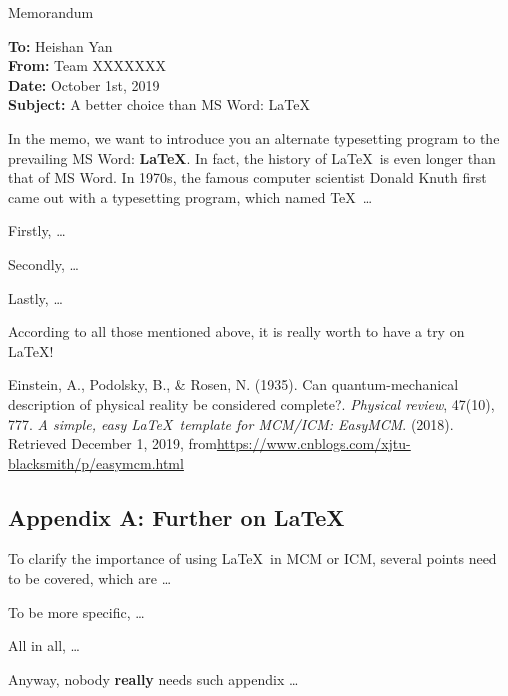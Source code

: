 \documentclass[12pt]{article}  %
\begin{document}
\begin{letter}{Memorandum}
\begin{flushleft}  %
\textbf{To:} Heishan Yan\\
\textbf{From:} Team XXXXXXX\\
\textbf{Date:} October 1st, 2019\\
\textbf{Subject:} A better choice than MS Word: \LaTeX
\end{flushleft}

In the memo, we want to introduce you an alternate typesetting program to the prevailing MS Word: \textbf{\LaTeX}. In fact, the history of \LaTeX\ is even longer than that of MS Word. In 1970s, the famous computer scientist Donald Knuth first came out with a typesetting program, which named \TeX\ \ldots

Firstly, \ldots

Secondly, \ldots

Lastly, \ldots

According to all those mentioned above, it is really worth to have a try on \LaTeX! 
\end{letter}


\begin{thebibliography}{99}
 Einstein, A., Podolsky, B., \& Rosen, N. (1935). Can quantum-mechanical description of physical reality be considered complete?. \emph{Physical review}, 47(10), 777.
 \emph{A simple, easy \LaTeX\ template for MCM/ICM: EasyMCM}. (2018). Retrieved December 1, 2019, from\url{https://www.cnblogs.com/xjtu-blacksmith/p/easymcm.html}
\end{thebibliography}


\begin{subappendices}  %

\section{Appendix A: Further on \LaTeX}
To clarify the importance of using \LaTeX\ in MCM or ICM, several points need to be covered, which are \ldots

To be more specific, \ldots

All in all, \ldots

Anyway, nobody \textbf{really} needs such appendix \ldots

\end{subappendices}
\end{document}
